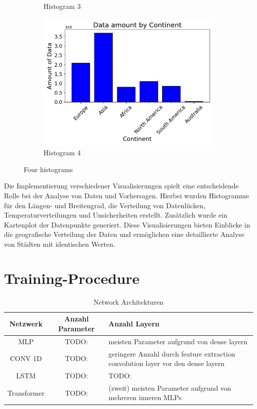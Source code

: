 \documentclass[manuscript,screen,review]{acmart}
\begin{document}
\begin{figure}[htp]
\begin{subfigure}{.45\textwidth}
      \caption{Histogram 3}
      \label{fig:sub3}
  \end{subfigure}%
  \begin{subfigure}{.45\textwidth}
      \centering
      \includegraphics[width=.8\linewidth]{./histograms/Continents}
      \caption{Histogram 4}
      \label{fig:sub4}
  \end{subfigure}
  \caption{Four histograms}
  \label{fig:test}
\end{figure}

Die Implementierung verschiedener Visualisierungen spielt eine entscheidende Rolle bei der Analyse von Daten und Vorhersagen. 
Hierbei wurden Histogramme für den Längen- und Breitengrad, die Verteilung von Datenlücken, Temperaturverteilungen und Unsicherheiten erstellt. 
Zusätzlich wurde ein Kartenplot der Datenpunkte generiert. 
Diese Visualisierungen bieten Einblicke in die geografische Verteilung der Daten und ermöglichen eine detaillierte Analyse von Städten mit identischen Werten.


\section{Training-Procedure}

\begin{table}
  \caption{Network Architekturen}
  \label{tab:freq}
  \begin{tabular}{ccl}
    \toprule
    Netzwerk&Anzahl Parameter&Anzahl Layern\\
    \midrule
    MLP & TODO: & meisten Parameter aufgrund von dense layern\\
    CONV 1D & TODO: & geringere Anzahl durch feature extraction convolution layer vor den dense layern\\
    LSTM & TODO: & TODO:\\
    Transformer & TODO: & (zweit) meisten Parameter aufgrund von mehreren inneren MLPs\\
  \bottomrule
\end{tabular}
\end{table}
\end{document}

